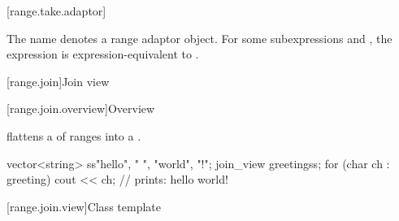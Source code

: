 [range.take.adaptor]{}

\pnum
The name  denotes a
range adaptor object.
For some subexpressions  and , the expression
 is expression-equivalent to
.


[range.join]{Join view}

[range.join.overview]{Overview}

\pnum
{} flattens a  of ranges into a
.

\pnum
\begin{example}
\begin{codeblock}
vector<string> ss{"hello", " ", "world", "!"};
join_view greeting{ss};
for (char ch : greeting)
  cout << ch; // prints: hello world!
\end{codeblock}
\end{example}

[range.join.view]{Class template }

